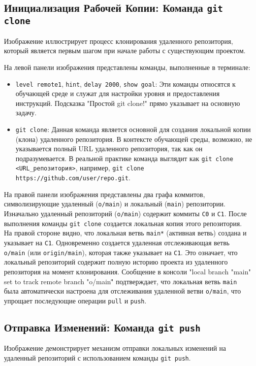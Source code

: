\subsection{Инициализация Рабочей Копии: Команда \texttt{git clone}}\label{subsec:git-clone}
Изображение  иллюстрирует процесс клонирования удаленного репозитория, который является первым шагом при начале работы с существующим проектом.

\label{fig:lgb_clone}

На левой панели изображения представлены команды, выполненные в терминале:
\begin{itemize}
    \item \texttt{level remote1}, \texttt{hint}, \texttt{delay 2000}, \texttt{show goal}: Эти команды относятся к обучающей среде и служат для настройки уровня и предоставления инструкций.
    Подсказка "Простой git clone!" прямо указывает на основную задачу.
    \item \texttt{git clone}: Данная команда является основной для создания локальной копии (клона) удаленного репозитория.
    В контексте обучающей среды, возможно, не указывается полный URL удаленного репозитория, так как он подразумевается.
    В реальной практике команда выглядит как \texttt{git clone <URL\_репозитория>}, например, \texttt{git clone https://github.com/user/repo.git}.
\end{itemize}
На правой панели изображения представлены два графа коммитов, символизирующие удаленный (\texttt{o/main}) и локальный (\texttt{main}) репозитории.
Изначально удаленный репозиторий (\texttt{o/main}) содержит коммиты \texttt{C0} и \texttt{C1}.
После выполнения команды \texttt{git clone} создается локальная копия этого репозитория.
На правой стороне видно, что локальная ветвь \texttt{main*} (активная ветвь) создана и указывает на \texttt{C1}.
Одновременно создается удаленная отслеживающая ветвь \texttt{o/main} (или \texttt{origin/main}), которая также указывает на \texttt{C1}.
Это означает, что локальный репозиторий содержит полную историю проекта из удаленного репозитория на момент клонирования.
Сообщение в консоли "local branch "main" set to track remote branch "o/main\"" подтверждает, что локальная ветвь \texttt{main} была автоматически настроена для отслеживания удаленной ветви \texttt{o/main}, что упрощает последующие операции \texttt{pull} и \texttt{push}.

\subsection{Отправка Изменений: Команда \texttt{git push}}\label{subsec:git-push}
Изображение  демонстрирует механизм отправки локальных изменений на удаленный репозиторий с использованием команды \texttt{git push}.

